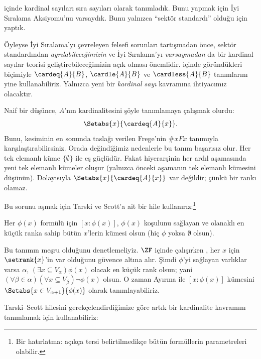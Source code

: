 \documentclass[../../../include/open-logic-section]{subfiles}
\begin{document}

 içinde kardinal
sayıları sıra sayıları olarak tanımladık. Bunu yapmak için İyi Sıralama
Aksiyomu'nu varsaydık. Bunu yalnızca ``sektör standardı'' olduğu için
yaptık.

Öyleyse İyi Sıralama'yı çevreleyen felsefi sorunları tartışmadan önce,
sektör standardından \emph{ayrılabileceğimizin} ve İyi Sıralama'yı
\emph{varsaymadan} da bir kardinal sayılar teorisi geliştirebileceğimizin
açık olması önemlidir.
 içinde göründükleri biçimiyle
$\cardeq{A}{B}$, $\cardle{A}{B}$ ve $\cardless{A}{B}$ tanımlarını yine
kullanabiliriz. Yalnızca yeni bir \emph{kardinal sayı} kavramına
ihtiyacımız olacaktır.

Naif bir düşünce, $A$'nın kardinalitesini şöyle tanımlamaya çalışmak olurdu:
\[
	\Setabs{x}{\cardeq{A}{x}}.
\]
Bunu,  kesiminin en sonunda taslağı verilen
Frege'nin $\# x Fx$ tanımıyla karşılaştırabilirsiniz. Orada değindiğimiz
nedenlerle bu tanım başarısız olur. Her tek elemanlı küme
$\{\emptyset\}$ ile eş güçlüdür. Fakat hiyerarşinin her ardıl aşamasında
yeni tek elemanlı kümeler oluşur (yalnızca önceki aşamanın tek elemanlı
kümesini düşünün). Dolayısıyla
$\Setabs{x}{\cardeq{A}{x}}$ var değildir; çünkü bir rankı olamaz.

Bu sorunu aşmak için Tarski ve Scott'a ait bir hile kullanırız:\footnote{Bir
hatırlatma: açıkça tersi belirtilmedikçe bütün formüllerin parametreleri
olabilir.}

\begin{defn}
Her $\phi(x)$ formülü için $[x:\phi(x)]$, $\phi(x)$ koşulunu sağlayan ve
olanaklı en küçük ranka sahip bütün $x$'lerin kümesi olsun (hiç $\phi$
yoksa $\emptyset$ olsun).
\end{defn}

Bu tanımın meşru olduğunu denetlemeliyiz. $\ZF$ içinde çalışırken
, her $x$ için
$\setrank{x}$'in var olduğunu güvence altına alır. Şimdi $\phi$'yi sağlayan
varlıklar varsa $\alpha$, $(\exists x\subseteq V_\alpha)\phi(x)$ olacak en
küçük rank olsun; yani
$(\forall\beta\in\alpha)(\forall x\subseteq V_\beta)\lnot\phi(x)$ olsun.
O zaman Ayırma ile $[x:\phi(x)]$ kümesini
$\Setabs{x\in V_{\alpha+1}}{\phi(x)}$ olarak tanımlayabiliriz.

Tarski--Scott hilesini gerekçelendirdiğimize göre artık bir kardinalite
kavramını tanımlamak için kullanabiliriz:
\end{document}
